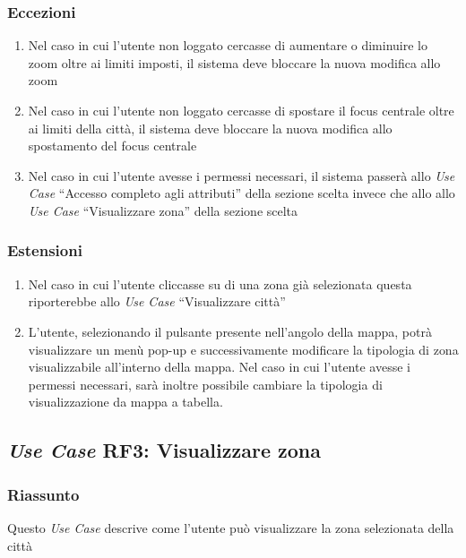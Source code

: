         \subsubsection{Eccezioni}
            \begin{enumerate}
                \item Nel caso in cui l'utente non loggato cercasse di aumentare o diminuire lo zoom oltre ai limiti imposti, il sistema deve bloccare la nuova modifica allo zoom
                \item Nel caso in cui l'utente non loggato cercasse di spostare il focus centrale oltre ai limiti della città, il sistema deve bloccare la nuova modifica allo spostamento del focus centrale
                \item Nel caso in cui l'utente avesse i permessi necessari, il sistema passerà allo \textit{Use Case} ``Accesso completo agli attributi'' della sezione scelta invece che allo allo \textit{Use Case} ``Visualizzare zona'' della sezione scelta
            \end{enumerate}
        \subsubsection{Estensioni}
            \begin{enumerate}
                \item Nel caso in cui l'utente cliccasse su di una zona già selezionata questa riporterebbe allo \textit{Use Case} ``Visualizzare città''
                \item L'utente, selezionando il pulsante presente nell'angolo della mappa, potrà visualizzare un menù pop-up e successivamente modificare la tipologia di zona visualizzabile all'interno della mappa.
                Nel caso in cui l'utente avesse i permessi necessari, sarà inoltre possibile cambiare la tipologia di visualizzazione da mappa a tabella.
            \end{enumerate}
    
    \subsection{\textit{Use Case} RF3: Visualizzare zona}
        \subsubsection{Riassunto}
            Questo \textit{Use Case} descrive come l'utente può visualizzare la zona selezionata della città
